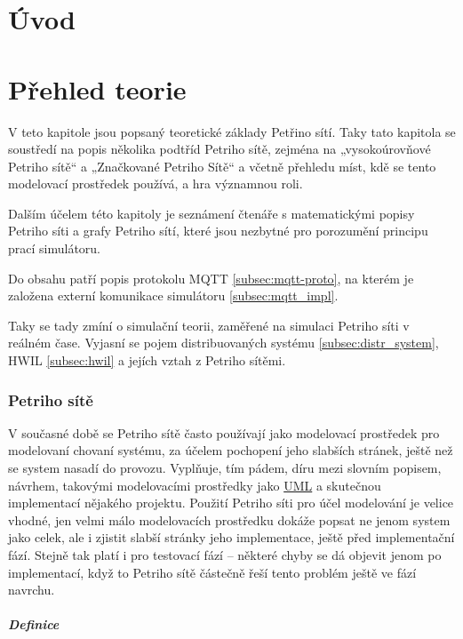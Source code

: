 \chapter{Úvod}
\chapter{Přehled teorie}
\label{prehled}

V teto kapitole jsou popsaný teoretické základy Petřino sítí. Taky tato kapitola se soustředí na popis několika podtříd Petriho sítě, zejména na „vysokoúrovňové Petriho sítě“ a „Značkované Petriho Sítě“ a  včetně přehledu míst, kdě se tento modelovací prostředek používá, a hra významnou roli.

Dalším účelem této kapitoly je seznámení čtenáře s matematickými popisy Petriho síti a grafy Petriho sítí, které jsou nezbytné pro porozumění principu prací simulátoru.

Do obsahu patří popis protokolu MQTT \ref{subsec:mqtt-proto}, na kterém je založena externí komunikace simulátoru \ref{subsec:mqtt_impl}.

Taky se tady zmíní o simulační teorii, zaměřené na simulaci Petriho síti v reálném čase. Vyjasní se pojem distribuovaných systému \ref{subsec:distr_system}, HWIL \ref{subsec:hwil} a jejích vztah z Petriho sítěmi.

\subsection{Petriho sítě}
V současné době se Petriho sítě často používají jako modelovací prostředek pro modelovaní chovaní systému, za účelem pochopení jeho slabších stránek, ještě než se system nasadí do provozu. Vyplňuje, tím pádem, díru mezi slovním popisem, návrhem, takovými modelovacími prostředky jako \href{https://en.wikipedia.org/wiki/Unified_Modeling_Language}{UML} a skutečnou implementací nějakého projektu. Použití Petriho síti pro účel modelování je velice vhodné, jen velmi málo modelovacích prostředku dokáže popsat ne jenom system jako celek, ale i zjistit slabší stránky jeho implementace, ještě před implementační fází. Stejně tak platí i pro testovací fází -- některé chyby se dá objevit jenom po implementací, když to Petriho sítě částečně řeší tento problém ještě ve fází navrchu.

\paragraph{Definice}

